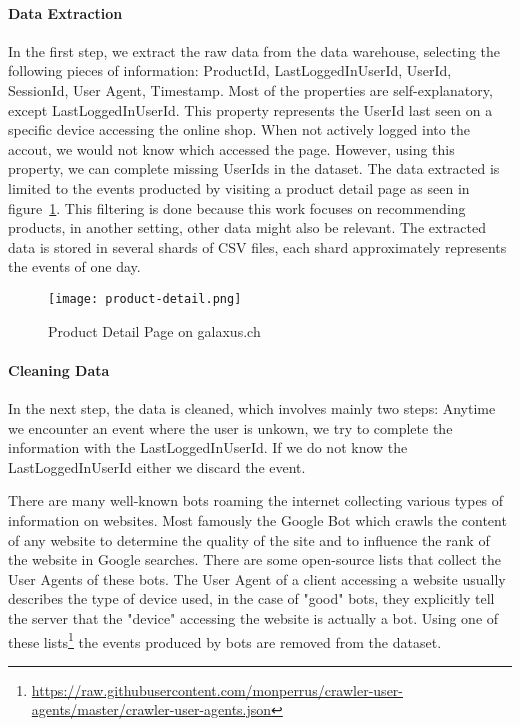 \paragraph{Data Extraction}
In the first step, we extract the raw data from the data warehouse, selecting the following pieces of information: ProductId, LastLoggedInUserId, UserId, SessionId, User Agent, Timestamp.
Most of the properties are self-explanatory, except LastLoggedInUserId.
This property represents the UserId last seen on a specific device accessing the online shop.
When not actively logged into the accout, we would not know which accessed the page.
However, using this property, we can complete missing UserIds in the dataset.
The data extracted is limited to the events producted by visiting a product detail page as seen in figure~\ref{fig:product_detail}.
This filtering is done because this work focuses on recommending products, in another setting, other data might also be relevant.
The extracted data is stored in several shards of CSV files, each shard approximately represents the events of one day.
\begin{figure}[t]
	\centering
	\captionsetup{width=0.8\textwidth}
    \texttt{[image: product-detail.png]}
    \caption{Product Detail Page on galaxus.ch}
    \label{fig:product_detail}
\end{figure}
\paragraph{Cleaning Data}
In the next step, the data is cleaned, which involves mainly two steps:
Anytime we encounter an event where the user is unkown, we try to complete the information with the LastLoggedInUserId. 
If we do not know the LastLoggedInUserId either we discard the event.
\par
There are many well-known bots roaming the internet collecting various types of information on websites.
Most famously the Google Bot which crawls the content of any website to determine the quality of the site and to influence the rank of the website in Google searches.
There are some open-source lists that collect the User Agents of these bots.
The User Agent of a client accessing a website usually describes the type of device used, in the case of "good" bots, they explicitly tell the server that the "device" accessing the website is actually a bot.
Using one of these lists\footnote{\url{https://raw.githubusercontent.com/monperrus/crawler-user-agents/master/crawler-user-agents.json}} the events produced by bots are removed from the dataset.

